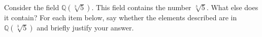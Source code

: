 \documentclass[11pt]{exam}
\def\Q{\mathbb Q}
\begin{document}
\begin{questions}
\question[12] Consider the field $\Q(\sqrt[3]{5})$.  This field contains the number $\sqrt[3]{5}$.  What else does it contain?  For each item below, say whether the elements described are in $\Q(\sqrt[3]{5})$ and briefly justify your answer.  
\end{questions}
\end{document}
